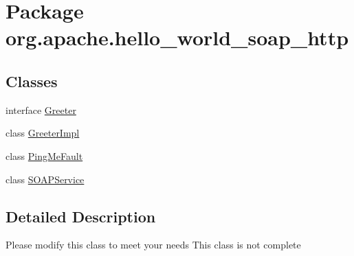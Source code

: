 \hypertarget{namespaceorg_1_1apache_1_1hello__world__soap__http}{}\section{Package org.\+apache.\+hello\+\_\+world\+\_\+soap\+\_\+http}
\label{namespaceorg_1_1apache_1_1hello__world__soap__http}
\subsection*{Classes}
\begin{DoxyCompactItemize}
\item 
interface \hyperlink{interfaceorg_1_1apache_1_1hello__world__soap__http_1_1_greeter}{Greeter}
\item 
class \hyperlink{classorg_1_1apache_1_1hello__world__soap__http_1_1_greeter_impl}{Greeter\+Impl}
\item 
class \hyperlink{classorg_1_1apache_1_1hello__world__soap__http_1_1_ping_me_fault}{Ping\+Me\+Fault}
\item 
class \hyperlink{classorg_1_1apache_1_1hello__world__soap__http_1_1_s_o_a_p_service}{S\+O\+A\+P\+Service}
\end{DoxyCompactItemize}


\subsection{Detailed Description}
Please modify this class to meet your needs This class is not complete 